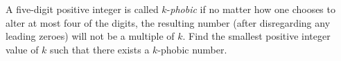 A five-digit positive integer is called $k$-\emph{phobic} if no matter how one chooses to alter at most four of the digits, the resulting number (after disregarding any leading zeroes) will not be a multiple of $k$. Find the smallest positive integer value of $k$ such that there exists a $k$-phobic number.
